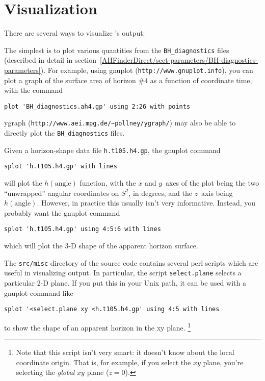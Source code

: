 
\section{Visualization}
\label{AHFinderDirect/sect-visualization}

There are several ways to visualize 's output:

The simplest is to plot various quantities from the
\verb|BH_diagnostics| files (described in detail in
section~\ref{AHFinderDirect/sect-parameters/BH-diagnostics-parameters}).
For example, using gnuplot (\verb|http://www.gnuplot.info|), you can
plot a graph of the surface area of horizon \#4 as a function of
coordinate time, with the command
\begin{verbatim}
plot 'BH_diagnostics.ah4.gp' using 2:26 with points
\end{verbatim}
ygraph (\verb|http://www.aei.mpg.de/~pollney/ygraph/|) may also be
able to directly plot the \verb|BH_diagnostics| files.

Given a horizon-shape data file \verb|h.t105.h4.gp|, the gnuplot
command
\begin{verbatim}
splot 'h.t105.h4.gp' with lines
\end{verbatim}
will plot the $h(\text{angle})$ function, with the $x$ and $y$~axes
of the plot being the two ``unwrapped'' angular coordinates on $S^2$,
in degrees, and the $z$~axis being $h(\text{angle})$.  However,
in practice this usually isn't very informative.  Instead, you
probably want the gnuplot command
\begin{verbatim}
splot 'h.t105.h4.gp' using 4:5:6 with lines
\end{verbatim}
which will plot the 3-D shape of the apparent horizon surface.

The \verb|src/misc| directory of the  source
code contains several perl scripts which are useful in visualizing
 output.  In particular, the script \verb|select.plane|
selects a particular 2-D plane.  If you put this in your Unix path,
it can be used with a gnuplot command like
\begin{verbatim}
splot '<select.plane xy <h.t105.h4.gp' using 4:5 with lines
\end{verbatim}
to show the shape of an apparent horizon in the xy plane.%
\footnote{%
	 Note that this script isn't very smart: it doesn't
	 know about the  local coordinate
	 origin.  That is, for example, if you select the $xy$
	 plane, you're selecting the \emph{global} $xy$ plane
	 ($z=0$).
	 }%

